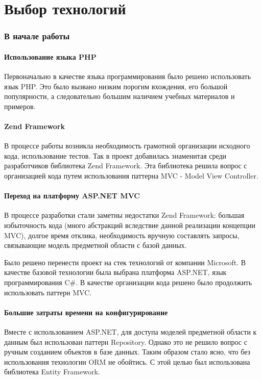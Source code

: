 \newpage
\chapter{Выбор технологий}
\subsection{В начале работы}
\subsubsection{Использование языка PHP}
Первоначально в качестве языка программирования было решено использовать язык
PHP. Это было вызвано низким порогим вхождения, его большой популярности, а
следовательно большим наличием учебных материалов и примеров.

\subsubsection{Zend Framework}
В процессе работы возникла необходимость грамотной организации исходного кода,
использование тестов. Так в проект добавилась знаменитая среди разработчиков
библиотека Zend Framework. Эта библиотека решила вопрос с организацией кода
путем использования паттерна MVC - Model View Controller.

\subsubsection{Переход на платформу ASP.NET MVC}
В процессе разработки стали заметны недостатки Zend Framework: большая
избыточность кода (много абстракций вследствие данной реализации концепции MVC),
долгое время отклика, необходимость вручную составлять запросы, связывающие
модель предметной области с базой данных.

Было решено перенести проект на стек технологий от компании Microsoft. В
качестве базовой технологии была выбрана платформа  ASP.NET, язык
программирования C\#. В качестве организации кода решено было продолжить
использовать паттерн MVC.

\subsubsection{Большие затраты времени на конфигурирование}
Вместе с использованием ASP.NET, для доступа моделей предметной области к данным
был использован паттерн Repository. Однако это не решило вопрос с ручным
созданием объектов в базе данных. Таким образом  стало ясно, что без
использования технологии ORM не обойтись. С этой целью был использована
библиотека Entity Framework.

